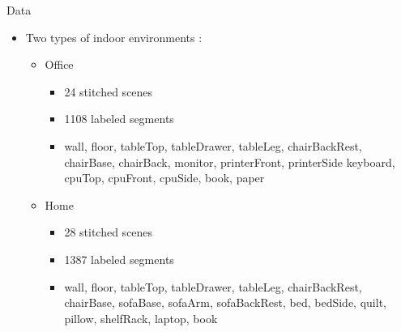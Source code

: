\documentclass{beamer}
\begin{document}
\begin{frame}{Data}
\begin{itemize}
   \item Two types of indoor environments : 
   \begin{itemize}
   \item Office 
   	\begin{itemize}
	\item 24 stitched scenes
	\item 1108 labeled segments
	\item wall, floor, tableTop, tableDrawer, tableLeg, chairBackRest, chairBase, chairBack, monitor, printerFront, printerSide keyboard, cpuTop, cpuFront, cpuSide, book, paper
	\end{itemize}
   \item Home
   	\begin{itemize}
   	\item  28 stitched scenes
	\item 1387 labeled segments
	\item wall, floor, tableTop, tableDrawer, tableLeg, chairBackRest, chairBase, sofaBase, sofaArm, sofaBackRest, bed, bedSide, quilt, pillow, shelfRack, laptop, book 
	\end{itemize} 
\end{itemize}
\end{itemize}
\end{frame}
\end{document}
